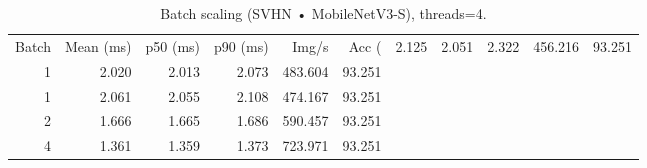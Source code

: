 \begin{table}
\caption{Batch scaling (SVHN • MobileNetV3-S), threads=4.}
\label{tab:batch_svhn_mobilenet_v3_small}
\begin{tabular}{rrrrrr}
\toprule
Batch & Mean (ms) & p50 (ms) & p90 (ms) & Img/s & Acc (%
 & 2.125 & 2.051 & 2.322 & 456.216 & 93.251 \\
1 & 2.020 & 2.013 & 2.073 & 483.604 & 93.251 \\
1 & 2.061 & 2.055 & 2.108 & 474.167 & 93.251 \\
2 & 1.666 & 1.665 & 1.686 & 590.457 & 93.251 \\
4 & 1.361 & 1.359 & 1.373 & 723.971 & 93.251 \\
\bottomrule
\end{tabular}
\end{table}
